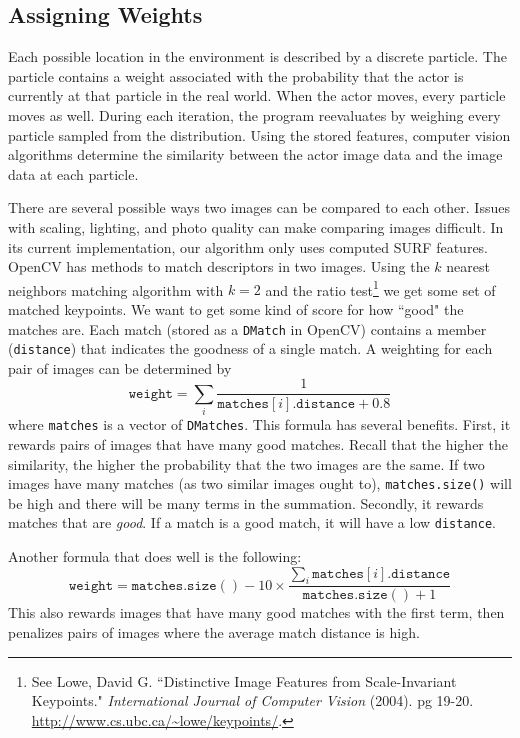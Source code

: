 \documentclass[a4paper,11pt]{article}
\begin{document}
\subsection{Assigning Weights}
Each possible location in the environment is described by a discrete particle. The particle contains a weight associated with the probability that the actor is currently at that particle in the real world. When the actor moves, every particle moves as well. During each iteration, the program reevaluates by weighing every particle sampled from the distribution. Using the stored features, computer vision algorithms determine the similarity between the actor image data and the image data at each particle.

There are several possible ways two images can be compared to each other. Issues with scaling, lighting, and photo quality can make comparing images difficult. In its current implementation, our algorithm only uses computed SURF features. OpenCV has methods to match descriptors in two images. Using the $k$ nearest neighbors matching algorithm with $k = 2$ and the ratio test\footnote{See Lowe, David G. ``Distinctive Image Features from Scale-Invariant Keypoints." {\it International Journal of Computer Vision} (2004). pg 19-20.  \url{http://www.cs.ubc.ca/~lowe/keypoints/}.} we get some set of matched keypoints. We want to get some kind of score for how ``good" the matches are. Each match (stored as a \verb.DMatch. in OpenCV) contains a member (\verb.distance.) that indicates the goodness of a single match. A weighting for each pair of images can be determined by
\[
	\mathtt{weight} = \sum_{i} \frac1{\mathtt{matches}[i].\mathtt{distance} + 0.8}
\]
where \verb.matches. is a vector of \verb.DMatches.. This formula has several benefits. First, it rewards pairs of images that have many good matches. Recall that the higher the similarity, the higher the probability that the two images are the same. If two images have many matches (as two similar images ought to), \verb`matches.size()` will be high and there will be many terms in the summation. Secondly, it rewards matches that are {\it good}. If a match is a good match, it will have a low \verb.distance.. 

Another formula that does well is the following:
\[
\mathtt{weight} = \mathtt{matches.size()} - 10 \times \frac{\sum_{i} \mathtt{matches}[i].\mathtt{distance}}{\mathtt{matches.size()} + 1}
\]
This also rewards images that have many good matches with the first term, then penalizes pairs of images where the average match distance is high.
\end{document}
